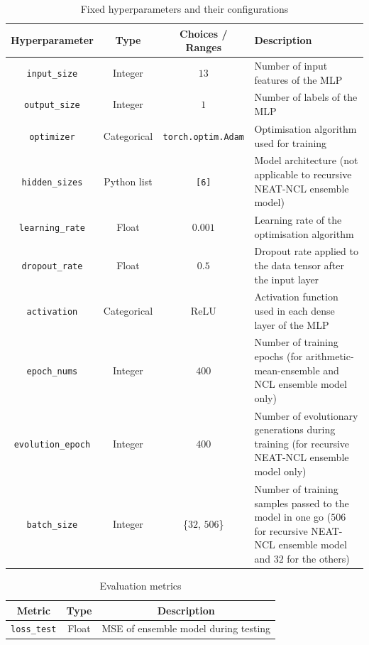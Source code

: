 \begin{table}[H]
    \centering
    \begin{tabular}{|c|c|c|p{7cm}|}
        \hline
        Hyperparameter & Type & Choices / Ranges & Description \\
        \hline
        \small\texttt{input\_size} & Integer & $13$ & Number of input features of the MLP \\
        \hline
        \small\texttt{output\_size} & Integer & $1$ & Number of labels of the MLP \\
        \hline
        \small\texttt{optimizer} & Categorical & \texttt{torch.optim.Adam} & Optimisation algorithm used for training \\
        \hline
        \small\texttt{hidden\_sizes} & Python list & \texttt{[6]} & Model architecture (not applicable to recursive NEAT-NCL ensemble model) \\
        \hline
        \small\texttt{learning\_rate} & Float & $0.001$ & Learning rate of the optimisation algorithm \\
        \hline
        \small\texttt{dropout\_rate} & Float & $0.5$ & Dropout rate applied to the data tensor after the input layer \\
        \hline
        \small\texttt{activation} & Categorical & ReLU & Activation function used in each dense layer of the MLP \\
        \hline
        \small\texttt{epoch\_nums} & Integer & $400$ & Number of training epochs (for arithmetic-mean-ensemble and NCL ensemble model only) \\
        \hline
        \small\texttt{evolution\_epoch} & Integer & $400$ & Number of evolutionary generations during training (for recursive NEAT-NCL ensemble model only) \\
        \hline
        \small\texttt{batch\_size} & Integer & \{$32$, $506$\} & Number of training samples passed to the model in one go ($506$ for recursive NEAT-NCL ensemble model and $32$ for the others) \\
        \hline
    \end{tabular}
    \caption{Fixed hyperparameters and their configurations}
    \label{table:experiment_6_fixed_hyperparameters}
\end{table}

\begin{table}[H]
    \centering
    \begin{tabular}{|c|c|c|}
        \hline
        Metric & Type & Description \\
        \hline
        \small\texttt{loss\_test} & Float & MSE of ensemble model during testing \\
        \hline
    \end{tabular}
    \caption{Evaluation metrics}
    \label{table:experiment_6_metric}
\end{table}